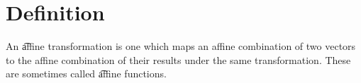 
\section*{Definition}

An \t{affine transformation} is one which maps an affine combination of two vectors to the affine combination of their results under the same transformation.
These are sometimes called \t{affine functions}.

\blankpage